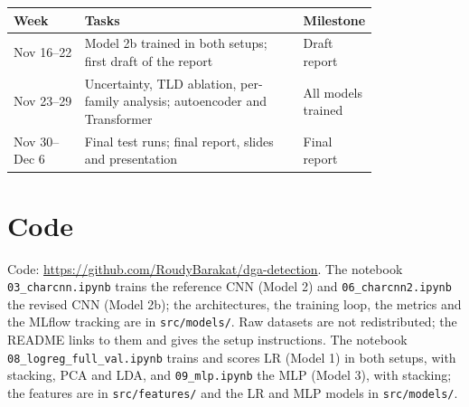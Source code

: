 \documentclass[11pt]{article}
\begin{document}
\smallskip
{\footnotesize
\begin{tabular}{@{}lp{0.6\linewidth}p{0.2\linewidth}@{}}
  \toprule
  Week & Tasks & Milestone \\
  \midrule
  Nov 16--22 & Model 2b trained in both setups; first draft of the report & Draft report \\
  Nov 23--29 & Uncertainty, TLD ablation, per-family analysis; autoencoder and Transformer & All models trained \\
  Nov 30--Dec 6 & Final test runs; final report, slides and presentation & Final report \\
  \bottomrule
\end{tabular}}

\section{Code}
Code: \url{https://github.com/RoudyBarakat/dga-detection}. The notebook
\texttt{03\_charcnn.ipynb} trains the reference CNN (Model 2) and
\texttt{06\_charcnn2.ipynb} the revised CNN (Model 2b); the architectures, the
training loop, the metrics and the MLflow tracking are in \texttt{src/models/}.
Raw datasets are not redistributed; the README links to them and gives the setup
instructions.
The notebook \texttt{08\_logreg\_full\_val.ipynb} trains and scores LR
(Model 1) in both setups, with stacking, PCA and LDA, and
\texttt{09\_mlp.ipynb} the MLP (Model 3), with stacking; the features are in
\texttt{src/features/} and the LR and MLP models in \texttt{src/models/}.



\end{document}
